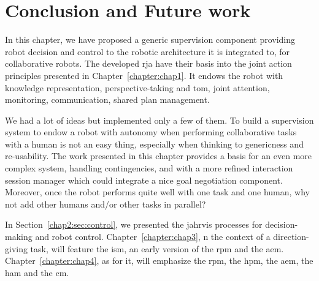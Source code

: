 \documentclass[a4paper,11pt,twoside]{StyleThese}
\begin{document}
	\setcounter{chapter}{3} %
	\dominitoc
	\faketableofcontents
	\fi

\clearpage
\chapter{Conclusion and Future work}
In this chapter, we have proposed a generic supervision component providing robot decision and control to the robotic architecture it is integrated to, for collaborative robots. The developed \acrfull{rja} have their basis into the joint action principles presented in Chapter~\ref{chapter:chap1}. It endows the robot with knowledge representation, perspective-taking and \acrshort{tom}, joint attention, monitoring, communication, shared plan management.  


We had a lot of ideas but implemented only a few of them. To build a supervision system to endow a robot with autonomy when performing collaborative tasks with a human is not an easy thing, especially when thinking to genericness and re-usability. The work presented in this chapter provides a basis for an even more complex system, handling contingencies, and with a more refined interaction session manager which could integrate a nice goal negotiation component. Moreover, once the robot performs quite well with one task and one human, why not add other humans and/or other tasks in parallel?



In Section~\ref{chap2:sec:control}, we presented the \acrshort{jahrvis} processes for decision-making and robot control. Chapter~\ref{chapter:chap3}, n the context of a direction-giving task, will feature the \acrlong{ism}, an early version of the \acrlong{rpm} and the \acrlong{aem}. Chapter~\ref{chapter:chap4}, as for it, will emphasize the \acrlong{rpm}, the \acrlong{hpm}, the \acrlong{aem}, the \acrlong{ham} and the \acrlong{cm}.

\ifdefined{}
\else


\end{document}
